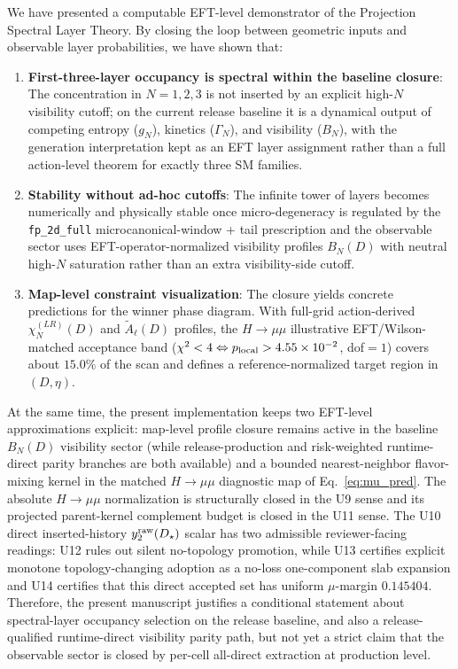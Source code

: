 \documentclass[aps,prd,onecolumn,notitlepage,nofootinbib,superscriptaddress,11pt,floatfix]{revtex4-2}
\begin{document}
We have presented a computable EFT-level demonstrator of the Projection Spectral Layer Theory. By closing the loop between geometric inputs and observable layer probabilities, we have shown that:
\begin{enumerate}
    \item \textbf{First-three-layer occupancy is spectral within the baseline closure}: The concentration in \(N=1,2,3\) is not inserted by an explicit high-\(N\) visibility cutoff; on the current release baseline it is a dynamical output of competing entropy ($g_N$), kinetics ($\Gamma_N$), and visibility ($B_N$), with the generation interpretation kept as an EFT layer assignment rather than a full action-level theorem for exactly three SM families.
    \item \textbf{Stability without ad-hoc cutoffs}: The infinite tower of layers becomes numerically and physically stable once micro-degeneracy is regulated by the \texttt{fp\_2d\_full} microcanonical-window + tail prescription and the observable sector uses EFT-operator-normalized visibility profiles $B_N(D)$ with neutral high-$N$ saturation rather than an extra visibility-side cutoff.
    \item \textbf{Map-level constraint visualization}: The closure yields concrete predictions for the winner phase diagram. With full-grid action-derived $\chi_N^{(LR)}(D)$ and $\tilde A_\ell(D)$ profiles, the $H\to\mu\mu$ illustrative EFT/Wilson-matched acceptance band ($\chi^2<4 \Leftrightarrow p_{\rm local}>4.55\times10^{-2}$, dof$=1$) covers about $15.0\%$ of the scan and defines a reference-normalized target region in $(D,\eta)$.
\end{enumerate}
At the same time, the present implementation keeps two EFT-level approximations explicit: map-level profile closure remains active in the baseline $B_N(D)$ visibility sector (while release-production and risk-weighted runtime-direct parity branches are both available) and a bounded nearest-neighbor flavor-mixing kernel in the matched $H\to\mu\mu$ diagnostic map of Eq.~\eqref{eq:mu_pred}. The absolute \(H\to\mu\mu\) normalization is structurally closed in the U9 sense and its projected parent-kernel complement budget is closed in the U11 sense.  The U10 direct inserted-history \(y_2^{\rm raw}(D_\star)\) scalar has two admissible reviewer-facing readings: U12 rules out silent no-topology promotion, while U13 certifies explicit monotone topology-changing adoption as a no-loss one-component slab expansion and U14 certifies that this direct accepted set has uniform \(\mu\)-margin \(0.145404\). Therefore, the present manuscript justifies a conditional statement about spectral-layer occupancy selection on the release baseline, and also a release-qualified runtime-direct visibility parity path, but not yet a strict claim that the observable sector is closed by per-cell all-direct extraction at production level.
\end{document}
